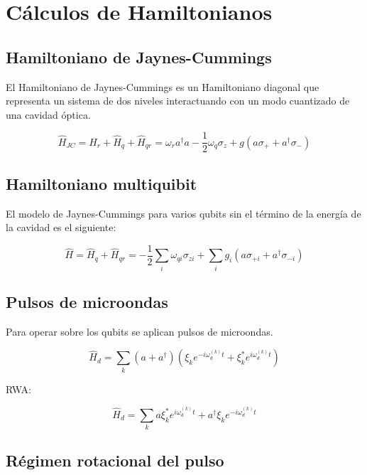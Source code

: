 \chapter{Cálculos de Hamiltonianos}

\section{Hamiltoniano de Jaynes-Cummings}

El Hamiltoniano de Jaynes-Cummings es un Hamiltoniano diagonal que representa un
sistema de dos niveles interactuando con un modo cuantizado de una cavidad óptica.

\begin{equation}
    \hat{H}_{JC} = \hat{H}_r + \hat{H}_q + \hat{H}_{qr} = \omega_r a^\dag a - \frac{1}{2} \omega_q \sigma_z + g(a \sigma_+ + a^\dag \sigma_-)
\end{equation}

\section{Hamiltoniano multiquibit}

El modelo de Jaynes-Cummings para varios qubits sin el término de la energía de la cavidad es el siguiente:

\begin{equation}
    \hat{H} = \hat{H}_q + \hat{H}_{qr} = - \frac{1}{2} \sum\limits_i \omega_{qi} \sigma_{zi} + \sum\limits_i g_i (a \sigma_{+ i} + a^\dagger \sigma_{- i})
\end{equation}

\section{Pulsos de microondas}

Para operar sobre los qubits se aplican pulsos de microondas.

\begin{equation}
    \hat{H}_d = \sum\limits_k (a+a^\dagger) (\xi_k e^{-i\omega_d^{(k)}t} + \xi_k^*e^{i\omega_d^{(k)}t})
\end{equation}

RWA:

\begin{equation}
    \hat{H}_d=\sum\limits_k a\xi_k^*e^{i\omega_d^{(k)}t}+ a^\dagger\xi_ke^{-i\omega_d^{(k)}t}
\end{equation}

\section{Régimen rotacional del pulso}

